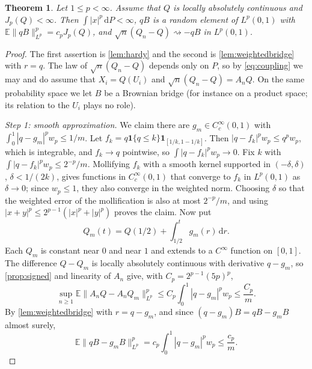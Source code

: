 \documentclass[11pt]{amsart}
\newtheorem{theorem}{Theorem}[section]
\theoremstyle{remark}
\newcommand{\E}{\mathbb{E}}
\newcommand{\ind}{\mathbf{1}}
\newcommand{\dd}{\,\mathrm{d}}
\newcommand{\Lp}{L^p(0,1)}
\newcommand{\weak}{\rightsquigarrow}
\begin{document}
\begin{theorem}\label{thm:sufficiency}
Let $1\le p<\infty$. Assume that $Q$ is locally absolutely continuous and $J_p(Q)<\infty$. Then $\int|x|^p\dd P<\infty$, $qB$ is a random element of $\Lp$ with $\E\|qB\|_{L^p}^p=c_pJ_p(Q)$, and $\sqrt n(Q_n-Q)\weak-qB$ in $\Lp$.
\end{theorem}

\begin{proof}
The first assertion is \cref{lem:hardy} and the second is \cref{lem:weightedbridge} with $r=q$. The law of $\sqrt n(Q_n-Q)$ depends only on $P$, so by \eqref{eq:coupling} we may and do assume that $X_i=Q(U_i)$ and $\sqrt n(Q_n-Q)=A_nQ$. On the same probability space we let $B$ be a Brownian bridge (for instance on a product space; its relation to the $U_i$ plays no role).

\emph{Step 1: smooth approximation.} We claim there are $g_m\in C_c^\infty(0,1)$ with $\int_0^1|q-g_m|^pw_p\le1/m$. Let $f_k=q\ind\{q\le k\}\ind_{[1/k,1-1/k]}$. Then $|q-f_k|^pw_p\le q^pw_p$, which is integrable, and $f_k\to q$ pointwise, so $\int|q-f_k|^pw_p\to0$. Fix $k$ with $\int|q-f_k|^pw_p\le2^{-p}/m$. Mollifying $f_k$ with a smooth kernel supported in $(-\delta,\delta)$, $\delta<1/(2k)$, gives functions in $C_c^\infty(0,1)$ that converge to $f_k$ in $L^p(0,1)$ as $\delta\to0$; since $w_p\le1$, they also converge in the weighted norm. Choosing $\delta$ so that the weighted error of the mollification is also at most $2^{-p}/m$, and using $|x+y|^p\le2^{p-1}(|x|^p+|y|^p)$ proves the claim. Now put
\[
Q_m(t)=Q(1/2)+\int_{1/2}^tg_m(r)\dd r .
\]
Each $Q_m$ is constant near $0$ and near $1$ and extends to a $C^\infty$ function on $[0,1]$. The difference $Q-Q_m$ is locally absolutely continuous with derivative $q-g_m$, so \cref{prop:signed} and linearity of $A_n$ give, with $C_p=2^{p-1}(5p)^p$,
\begin{equation}\label{eq:unif}
\sup_{n\ge1}\E\|A_nQ-A_nQ_m\|_{L^p}^p\le C_p\int_0^1|q-g_m|^pw_p\le\frac{C_p}{m}.
\end{equation}
By \cref{lem:weightedbridge} with $r=q-g_m$, and since $(q-g_m)B=qB-g_mB$ almost surely,
\begin{equation}\label{eq:unifB}
\E\|qB-g_mB\|_{L^p}^p=c_p\int_0^1|q-g_m|^pw_p\le\frac{c_p}{m}.
\end{equation}


\end{proof}
\end{document}
